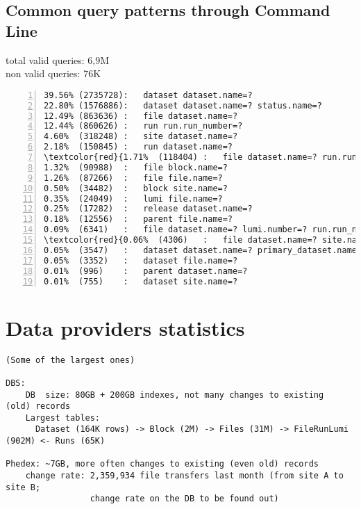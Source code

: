 \newpage
\subsection{Common query patterns through Command Line\label{appendix_das_cli_logs}}
total valid queries: 6,9M\\
non valid queries: 76K

\begin{Verbatim}[commandchars=\\\{\},numbers=left,numbersep=4pt]
39.56% (2735728):	dataset dataset.name=?
22.80% (1576886):	dataset dataset.name=? status.name=?
12.49% (863636) :	file dataset.name=?
12.44% (860626) :	run run.run_number=?
4.60%  (318248) :	site dataset.name=?
2.18%  (150845) :	run dataset.name=?
\textcolor{red}{1.71%  (118404) :	file dataset.name=? run.run_number=?}\label{run_dataset_heavy}
1.32%  (90988)  :	file block.name=?
1.26%  (87266)  :	file file.name=?
0.50%  (34482)  :	block site.name=?
0.35%  (24049)  :	lumi file.name=?
0.25%  (17282)  :	release dataset.name=?
0.18%  (12556)  :	parent file.name=?
0.09%  (6341)   :	file dataset.name=? lumi.number=? run.run_number=?
\textcolor{red}{0.06%  (4306)   :	file dataset.name=? site.name=?}\label{site_dataset_distr_heavy}
0.05%  (3547)   :	dataset dataset.name=? primary_dataset.name=? release.name=? tier.name=?
0.05%  (3352)   :	dataset file.name=?
0.01%  (996)    :	parent dataset.name=?
0.01%  (755)    :	dataset site.name=?
\end{Verbatim}


% 
%

\section{Data providers statistics}
{\small
\begin{verbatim}
(Some of the largest ones)

DBS:
    DB  size: 80GB + 200GB indexes, not many changes to existing  (old) records
    Largest tables: 
      Dataset (164K rows) -> Block (2M) -> Files (31M) -> FileRunLumi (902M) <- Runs (65K)

Phedex: ~7GB, more often changes to existing (even old) records
    change rate: 2,359,934 file transfers last month (from site A to site B; 
                 change rate on the DB to be found out)
\end{verbatim}
}
